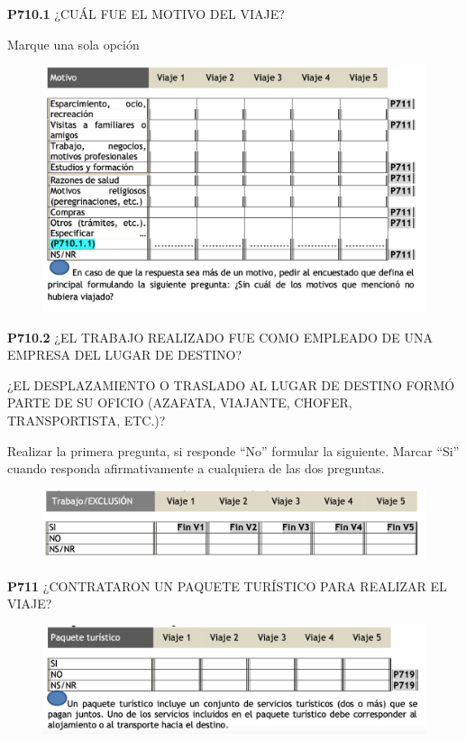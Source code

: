 \documentclass[
  openany]{book}
\begin{document}
\textbf{P710.1} ¿CUÁL FUE EL MOTIVO DEL VIAJE?

Marque una sola opción

\begin{figure}

{\centering \includegraphics[width=1\linewidth]{imagenes/figura6-244} 

}

\end{figure}

\textbf{P710.2} ¿EL TRABAJO REALIZADO FUE COMO EMPLEADO DE UNA EMPRESA DEL LUGAR DE DESTINO?

¿EL DESPLAZAMIENTO O TRASLADO AL LUGAR DE DESTINO FORMÓ PARTE DE SU OFICIO (AZAFATA, VIAJANTE, CHOFER, TRANSPORTISTA, ETC.)?

Realizar la primera pregunta, si responde ``No'' formular la siguiente. Marcar ``Si'' cuando responda afirmativamente a cualquiera de las dos preguntas.

\begin{figure}

{\centering \includegraphics[width=1\linewidth]{imagenes/figura6-245} 

}

\end{figure}

\textbf{P711} ¿CONTRATARON UN PAQUETE TURÍSTICO PARA REALIZAR EL VIAJE?

\begin{figure}

{\centering \includegraphics[width=1\linewidth]{imagenes/figura6-246} 

}

\end{figure}
\end{document}
